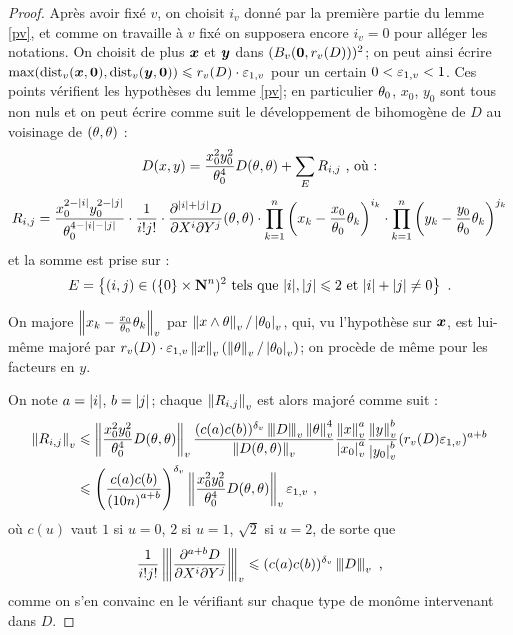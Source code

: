 \begin{proof}
Après avoir fixé $v$, on choisit $i_v$ donné par la première partie du lemme \ref{pv}, et comme on travaille à $v$ fixé on supposera encore $i_v = 0$ pour alléger les notations. On choisit de plus ${\boldsymbol{x}}$ et ${\boldsymbol{y}}$ dans $(B_v({\boldsymbol{0}}, r_v(D)))^2$; on peut ainsi écrire $\max(\mathrm{dist}_v({\boldsymbol{x}}, {\boldsymbol{0}}), \mathrm{dist}_v({\boldsymbol{y}}, {\boldsymbol{0}})) \leqslant r_v(D)\cdot\varepsilon_{1, v}$ pour un certain $0 < \varepsilon_{1, v} < 1$. Ces points vérifient  les hypothèses du lemme \ref{pv}; en particulier $\theta_0$, $x_0$, $y_0$ sont tous non nuls et on peut écrire comme suit le développement de  bihomogène de $D$ au voisinage de $(\theta, \theta)$ :
\[ D(x, y) = \frac{x_0^2y_0^2}{\theta_0^4}D(\theta, \theta) + \sum_E R_{i, j} \text{ , où :} \]
\[
R_{i, j} = \frac{x_0^{2-{|i|}}y_0^{2-{|j|}}}{\theta_0^{4-{|i|}-{|j|}}}\cdot \frac{1}{i!j!} \cdot
\frac{\partial^{{|i|}+{|j|}}D}{\partial X^i \partial Y^j}(\theta, \theta) \cdot
\prod_{k=1}^n \left( x_{k} - \frac{x_0}{\theta_0} \theta_{k} \right)^{i_k} \cdot \prod_{k=1}^n \left( y_{k} - \frac{y_0}{\theta_0} \theta_{k} \right)^{j_k}
\]
et la somme est prise sur :
\[E = \left\{ (i, j) \in (\{0\} \times \mathbf{N}^n)^2 \text{ tels que } {|i|},{|j|} \leqslant 2 \text{ et } {|i|}+{|j|} \neq 0 \right\} \text{ .} \]

On majore $\left\lVert x_k - \frac{x_0}{\theta_0} \theta_k\right\rVert_{v}$ par $\left\lVert x \wedge \theta\right\rVert_{v}/\left\lvert\theta_0\right\rvert_{v}$, qui, vu l'hypothèse sur ${\boldsymbol{x}}$, est lui-même majoré par $r_v(D)\cdot\varepsilon_{1, v} \left\lVert x\right\rVert_{v} (\left\lVert\theta\right\rVert_{v}/\left\lvert\theta_0\right\rvert_{v})$; on procède de même pour les facteurs en $y$.

On note $a = {|i|}$, $b={|j|}$; chaque $\left\lVert R_{i, j}\right\rVert_{v}$ est alors majoré comme suit :
\begin{align*}
\left\lVert R_{i, j}\right\rVert_{v} & \leqslant
\left\lVert\frac{x_0^2y_0^2}{\theta_0^4}D(\theta, \theta)\right\rVert_{v}
\frac{(c(a)c(b))^{\delta_v} \left\lvert\hspace{-1pt}\left\lvert\hspace{-1pt}\left\lvert D\right\rvert\hspace{-1pt}\right\rvert\hspace{-1pt}\right\rvert_{v}\left\lVert\theta\right\rVert_{v}^4}{\left\lVert D(\theta, \theta)\right\rVert_{v}}
\frac{\left\lVert x\right\rVert_{v}^a}{\left\lvert x_0\right\rvert_{v}^a} \frac{\left\lVert y\right\rVert_{v}^b}{\left\lvert y_0\right\rvert_{v}^b} (r_v(D)\varepsilon_{1, v})^{a+b}\\
& \leqslant \left( \frac{c(a)c(b)}{\left( 10n \right)^{a+b}} \right)^{\delta_v} \left\lVert\frac{x_0^2y_0^2}{\theta_0^4}D(\theta, \theta)\right\rVert_{v} \varepsilon_{1, v} \text{ ,}
\end{align*}
où $c(u)$ vaut $1$ si $u=0$, $2$ si $u=1$, $\sqrt{2}$ si $u=2$, de sorte que
\[ \frac{1}{i!j!}\left\lvert\hspace{-1pt}\left\lvert\hspace{-1pt}\left\lvert\frac{\partial^{a+b}D}{\partial X^i \partial Y^j}\right\rvert\hspace{-1pt}\right\rvert\hspace{-1pt}\right\rvert_{v} \leqslant (c(a) c(b))^{\delta_v} \left\lvert\hspace{-1pt}\left\lvert\hspace{-1pt}\left\lvert D\right\rvert\hspace{-1pt}\right\rvert\hspace{-1pt}\right\rvert_{v}\text{ ,} \]
comme on s'en convainc en le vérifiant sur chaque type de monôme intervenant dans $D$.


\end{proof}
